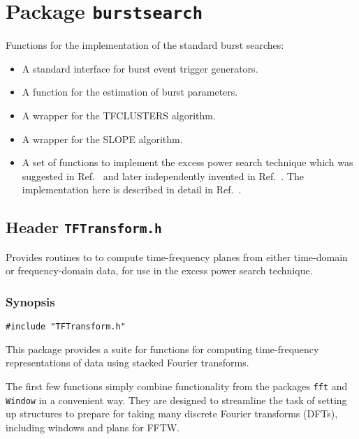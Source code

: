 \chapter{Package \texttt{burstsearch}}

Functions for the implementation of the standard burst searches:

\begin{itemize}

\item A standard interface for burst event trigger generators.

\item A function for the estimation of burst parameters.

\item A wrapper for the TFCLUSTERS algorithm.

\item A wrapper for the SLOPE algorithm.

\item A set of functions to implement the excess power search technique which was suggested in Ref.~\cite{fh:1998} and later independently invented in Ref.~\cite{acdhp:1999}.  The implementation here is described in detail in Ref.~\cite{abcf:2000}.

\end{itemize}

\newpage
\section{Header \texttt{TFTransform.h}}
\label{s:TFTransform.h}

\noindent Provides routines to to compute time-frequency planes from either
time-domain or frequency-domain data, for use in the excess
power search technique.

\subsection*{Synopsis}
\begin{verbatim}
#include "TFTransform.h"
\end{verbatim}

\noindent This package provides a suite for functions for computing time-frequency
representations of data using stacked Fourier transforms.

The first few functions simply combine functionality from the packages
\verb+fft+ and \verb+Window+ in a convenient way.  They are designed to
streamline the task of setting up structures to prepare for taking many
discrete Fourier transforms (DFTs), including windows and plans for FFTW.

